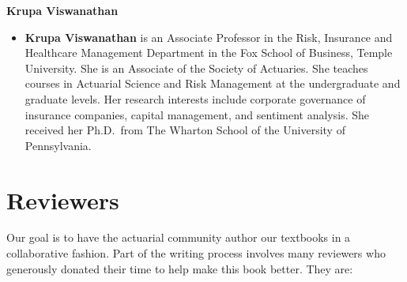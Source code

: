\documentclass[
  12pt,
  krantz2]{Format/krantzNoCorner}
\providecommand{\tightlist}{%
  \setlength{\itemsep}{0pt}\setlength{\parskip}{0pt}}
\begin{document}
\begin{center}
\textbf{ Krupa Viswanathan }
\end{center}

\begin{itemize}
\tightlist
\item
  \textbf{Krupa Viswanathan} is an Associate Professor in the Risk, Insurance and Healthcare Management Department in the Fox School of Business, Temple University. She is an Associate of the Society of Actuaries. She teaches courses in Actuarial Science and Risk Management at the undergraduate and graduate levels. Her research interests include corporate governance of insurance companies, capital management, and sentiment analysis. She received her Ph.D.~from The Wharton School of the University of Pennsylvania.
\end{itemize}

\hypertarget{reviewers}{%
\section*{Reviewers}\label{reviewers}}


Our goal is to have the actuarial community author our textbooks in a collaborative fashion. Part of the writing process involves many reviewers who generously donated their time to help make this book better. They are:
\end{document}
